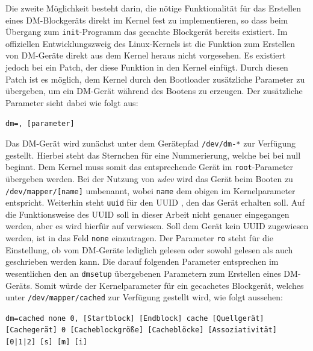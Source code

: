 Die zweite Möglichkeit besteht darin, die nötige Funktionalität für das Erstellen eines \ac{DM}-Blockgeräts direkt im Kernel fest zu implementieren, so dass beim
Übergang zum \texttt{init}-Programm das gecachte Blockgerät bereits existiert. Im offiziellen Entwicklungszweig des Linux-Kernels ist die Funktion zum Erstellen
von \ac{DM}-Geräte direkt aus dem Kernel heraus nicht vorgesehen. Es existiert jedoch bei \cite{boot-patch} ein Patch, der diese Funktion in den Kernel einfügt.
Durch diesen Patch ist es möglich, dem Kernel durch den Bootloader zusätzliche Parameter zu übergeben, um ein \ac{DM}-Gerät während des Bootens zu erzeugen. Der
zusätzliche Parameter sieht dabei wie folgt aus:

\begin{flushleft}
\hspace{0.25cm} \small \texttt{dm=\dq [name] [uuid] [ro], [parameter]\dq}
\end{flushleft}

Das \ac{DM}-Gerät wird zunächst unter dem Gerätepfad \texttt{/dev/dm-*} zur Verfügung gestellt. Hierbei steht das Sternchen für eine Nummerierung, welche bei bei
null beginnt. Dem Kernel muss somit das entsprechende Gerät im \texttt{root}-Parameter übergeben werden. Bei der Nutzung von \textit{udev} wird das Gerät beim
Booten zu \texttt{/dev/mapper/[name]} umbenannt, wobei \texttt{name} dem obigen im Kernelparameter entspricht. Weiterhin steht \texttt{uuid} für den \ac{UUID} ,
den das Gerät erhalten soll. Auf die Funktionsweise des \ac{UUID} soll in dieser Arbeit nicht genauer eingegangen werden, aber es wird hierfür auf \cite{uuid}
verwiesen. Soll dem Gerät kein \ac{UUID} zugewiesen werden, ist in das Feld \texttt{none} einzutragen. Der Parameter \texttt{ro} steht für die Einstellung, ob
vom \ac{DM}-Geräte lediglich gelesen oder sowohl gelesen als auch geschrieben werden kann. Die darauf folgenden Parameter entsprechen im wesentlichen den an
\texttt{dmsetup} übergebenen Parametern zum Erstellen eines \ac{DM}-Geräts. Somit würde der Kernelparameter für ein gecachetes Blockgerät, welches unter
\texttt{/dev/mapper/cached} zur Verfügung gestellt wird, wie folgt aussehen:

\begin{flushleft}
\hspace{0.25cm} \small \texttt{dm=\dq cached none 0, [Startblock] [Endblock] cache [Quellgerät] [Cachegerät] 0 [Cacheblockgröße] [Cacheblöcke] [Assoziativität]
[0|1|2] [s] [m] [i]\dq}
\end{flushleft}

